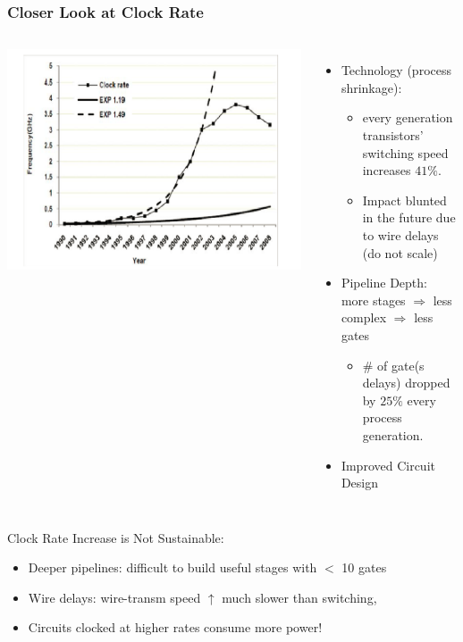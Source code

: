 \documentclass{beamer}
\renewcommand{\emph}[1]{\textcolor{structure}{#1}}
\newcommand{\emp}[1]{\textcolor{DikuRed}{ #1}}
\begin{document}
\begin{frame}[fragile,t]
\frametitle{Closer Look at Clock Rate}

\begin{columns}
\includegraphics[width=40ex]{Ch1Figs/FreqGraph}
        \begin{itemize}
            \item \emph{Technology} (process shrinkage):\smallskip
                \begin{itemize}
                    \item every generation 
                            transistors' \emph{switching speed increases $41\%$}.

                    \item Impact blunted in the future due to \emp{wire delays}
                                (do not scale)
                \end  {itemize}\medskip
            \item \emph{Pipeline Depth:} more stages $\Rightarrow$\smallskip 
                            less complex $\Rightarrow$ less gates 
                \begin{itemize}
                    \item \# of gate(s delays) dropped by $25\%$ every process generation.
                \end  {itemize}\medskip

                \item \emph{Improved Circuit Design} 
        \end  {itemize}\bigskip
\end{columns}

Clock Rate Increase is Not Sustainable:
\begin{itemize}
    \item \emp{Deeper pipelines}: difficult to build useful stages with $<$ 10 gates
    \item \emp{Wire delays:} wire-transm speed $\uparrow$ much 
            slower than switching,
    \item Circuits clocked at \emp{higher rates consume more power}!  
\end  {itemize}

\end{frame}
\end{document}
